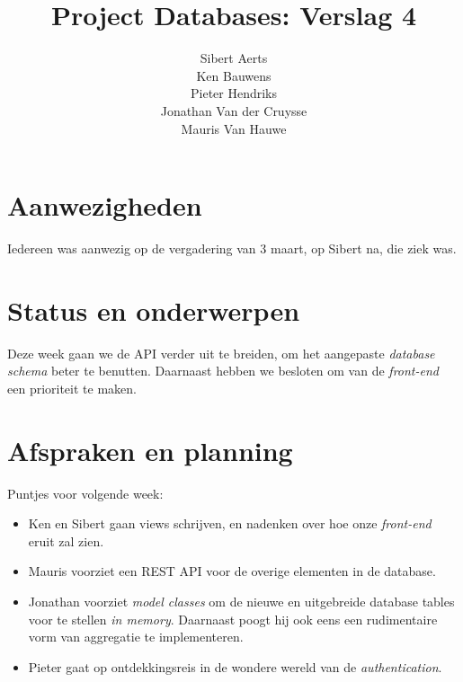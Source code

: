 \documentclass[10pt,a4paper]{article}
\author{Sibert Aerts\\
Ken Bauwens\\
Pieter Hendriks\\
Jonathan Van der Cruysse\\
Mauris Van Hauwe}
\title{Project Databases: Verslag 4}
\date{}
\begin{document}
  \maketitle
  \section{Aanwezigheden}
  Iedereen was aanwezig op de vergadering van 3 maart, op Sibert na, die ziek 
  was.
  
  \section{Status en onderwerpen}
  Deze week gaan we de API verder uit te breiden, om het aangepaste 
  \emph{database schema} beter te benutten. Daarnaast hebben we besloten om van 
  de \emph{front-end} een prioriteit te maken. 
  
  \section{Afspraken en planning}
  Puntjes voor volgende week:
  \begin{itemize}
    \item Ken en Sibert gaan views schrijven, en nadenken over hoe onze 
    \emph{front-end} eruit zal zien.
    \item Mauris voorziet een REST API voor de overige elementen in de 
    database.  
    \item Jonathan voorziet \emph{model classes} om de nieuwe en uitgebreide 
    database tables voor te stellen \emph{in memory}. Daarnaast poogt hij ook 
    eens een rudimentaire vorm van aggregatie te implementeren.
    \item Pieter gaat op ontdekkingsreis in de wondere wereld van de 
    \emph{authentication}.
  \end{itemize}
\end{document}
